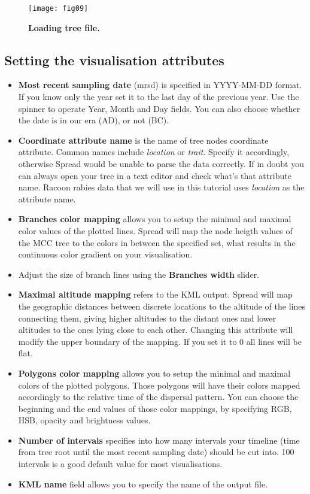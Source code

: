 \begin{figure}[H]
\begin{centering}
\texttt{[image: fig09]}
\caption{
{ \footnotesize 
{\bf Loading tree file.}
} %
}
\label{fig:09}
\par\end{centering}
\end{figure}

\subsection{Setting the visualisation attributes}

\begin{itemize}
\item \textbf{Most recent sampling date} (mrsd) is specified in YYYY-MM-DD
format. If you know only the year set it to the last day of the previous
year. Use the spinner to operate Year, Month and Day fields. You can
also choose whether the date is in our era (AD), or not (BC). 
\item \textbf{Coordinate attribute name} is the name of tree nodes coordinate
attribute. Common names include \textsl{location} or \textsl{trait}.
Specify it accordingly, otherwise Spread would be unable to parse
the data correctly. If in doubt you can always open your tree in a
text editor and check what's that attribute name. Racoon rabies data
that we will use in this tutorial uses \textsl{location }as the attribute
name.
\item \textbf{Branches color mapping} allows you to setup the minimal and
maximal color values of the plotted lines. Spread will map the node
heigth values of the MCC tree to the colors in between the specified
set, what results in the continuous color gradient on your visualisation.
\item Adjust the size of branch lines using the \textbf{Branches width}
slider.
\item \textbf{Maximal altitude mapping} refers to the KML output. Spread
will map the geographic distances between discrete locations to the
altitude of the lines connecting them, giving higher altitudes to
the distant ones and lower altitudes to the ones lying close to each
other. Changing this attribute will modify the upper boundary of the
mapping. If you set it to 0 all lines will be flat.
\item \textbf{Polygons color mapping} allows you to setup the minimal and
maximal colors of the plotted polygons. Those polygons will have their
colors mapped accordingly to the relative time of the dispersal pattern.
You can choose the beginning and the end values of those color mappings,
by specifying RGB, HSB, opacity and brightness values.
\item \textbf{Number of intervals} specifies into how many intervals your
timeline (time from tree root until the most recent sampling date)
should be cut into. 100 intervals is a good default value for most
visualisations.
\item \textbf{KML name} field allows you to specify the name of the output
file.
\end{itemize}

